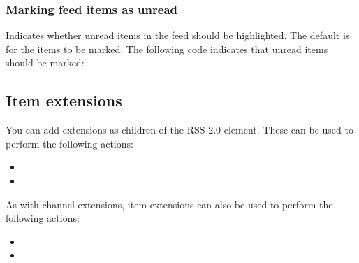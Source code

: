 \documentclass[letterpaper,12pt,english,openany,oneside]{sphinxmanual}
\begin{document}
\subsubsection{Marking feed items as unread}
\label{\detokenize{Tracker_InboxAPI:marking-feed-items-as-unread}}
\begin{sphinxVerbatim}[commandchars=\\\{\}]
\end{sphinxVerbatim}

Indicates whether unread items in the feed should be highlighted. The default is for the items to be marked. The following code indicates that unread items should be marked:

\begin{sphinxVerbatim}[commandchars=\\\{\}]
\end{sphinxVerbatim}


\subsection{Item extensions}
\label{\detokenize{Tracker_InboxAPI:item-extensions}}
You can add extensions as children of the RSS 2.0  element. These can be used to perform the following actions:
\begin{itemize}
\item {} 

\item {} 

\end{itemize}

As with channel extensions, item extensions can also be used to perform the following actions:
\begin{itemize}
\item {} 

\item {} 

\end{itemize}
\end{document}
